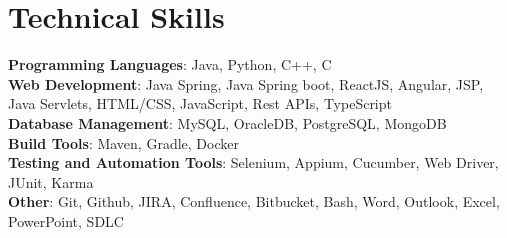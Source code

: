 \documentclass[letterpaper,11pt]{article}
\begin{document}
\section{Technical Skills}
 \begin{itemize}[leftmargin=0.15in, label={}]
    \small{\item{
     \textbf{Programming Languages}{: Java, Python, C++, C} \\
    \textbf{Web Development}{: Java Spring, Java Spring boot, ReactJS, Angular, JSP, Java Servlets, HTML/CSS, JavaScript, Rest APIs, TypeScript} \\
    \textbf{Database Management}{: MySQL, OracleDB, PostgreSQL, MongoDB} \\
    \textbf{Build Tools}{: Maven, Gradle, Docker} \\
    \textbf{Testing and Automation Tools}{: Selenium, Appium, Cucumber, Web Driver, JUnit, Karma} \\
    \textbf{Other}{: Git, Github, JIRA, Confluence, Bitbucket, Bash, Word, Outlook, Excel, PowerPoint, SDLC} \\

    }}
 \end{itemize}
\end{document}
